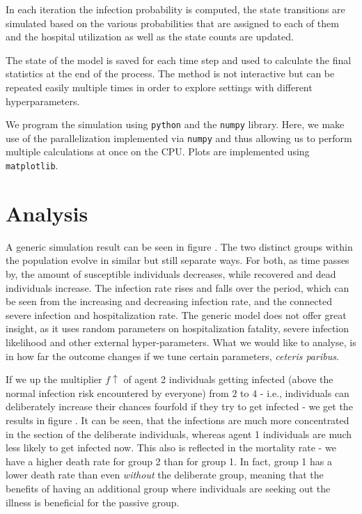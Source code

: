 \documentclass[]{article}
\begin{document}
In each iteration the infection probability is computed, the state transitions are simulated based on the various probabilities that are assigned to each of them and the hospital utilization as well as the state counts are updated.

The state of the model is saved for each time step and used to calculate the final statistics at the end of the process. The method is not interactive but can be repeated easily multiple times in order to explore settings with different hyperparameters. 

We program the simulation using \verb|python| and the \verb|numpy| library. Here, we make use of the parallelization implemented via \verb|numpy| and thus allowing us to perform multiple calculations at once on the CPU. Plots are implemented using \verb|matplotlib|. 

\section{Analysis}
A generic simulation result can be seen in figure . The two distinct groups within the population evolve in similar but still separate ways. For both, as time passes by, the amount of susceptible individuals decreases, while recovered and dead individuals increase. The infection rate rises and falls over the period, which can be seen from the increasing and decreasing infection rate, and the connected severe infection and hospitalization rate. The generic model does not offer great insight, as it uses random parameters on hospitalization fatality, severe infection likelihood and other external hyper-parameters. What we would like to analyse, is in how far the outcome changes if we tune certain parameters, \textit{ceteris paribus}. 



If we up the multiplier $f \uparrow$ of agent 2 individuals getting infected (above the normal infection risk encountered by everyone) from $2$ to $4$ - i.e., individuals can deliberately increase their chances fourfold if they try to get infected - we get the results in figure . It can be seen, that the infections are much more concentrated in the section of the deliberate individuals, whereas agent 1 individuals are much less likely to get infected now. This also is reflected in the mortality rate - we have a higher death rate for group 2 than for group 1. In fact, group 1 has a lower death rate than even \textit{without} the deliberate group, meaning that the benefits of having an additional group where individuals are seeking out the illness is beneficial for the passive group. 

\end{document}
